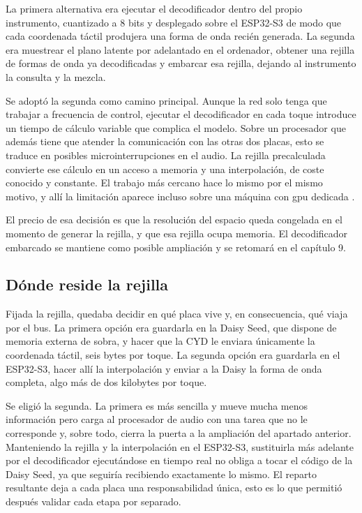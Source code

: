 La primera alternativa era ejecutar el decodificador dentro del propio
instrumento, cuantizado a 8 bits y desplegado sobre el ESP32-S3 de modo que
cada coordenada táctil produjera una forma de onda recién generada. La segunda
era muestrear el plano latente por adelantado en el ordenador, obtener una
rejilla de formas de onda ya decodificadas y embarcar esa rejilla, dejando al
instrumento la consulta y la mezcla.

Se adoptó la segunda como camino principal. Aunque la red solo tenga que
trabajar a frecuencia de control, ejecutar el decodificador en cada toque
introduce un tiempo de cálculo variable que complica el modelo. Sobre un procesador
que además tiene que atender la comunicación con las otras dos placas, esto se traduce 
en posibles microinterrupciones en el audio. La rejilla precalculada convierte ese cálculo
en un acceso a memoria y una interpolación, de coste conocido y constante. El trabajo más cercano
hace lo mismo por el mismo motivo, y allí la limitación aparece incluso sobre una máquina 
con \gls{gpu} dedicada \cite{Hantrakul2018}.

El precio de esa decisión es que la resolución del espacio queda congelada en el
momento de generar la rejilla, y que esa rejilla ocupa memoria. El decodificador
embarcado se mantiene como posible ampliación y se retomará en el capítulo 9.

\subsection{Dónde reside la rejilla}

Fijada la rejilla, quedaba decidir en qué placa vive y, en consecuencia, qué
viaja por el bus. La primera opción era guardarla en la Daisy Seed, que dispone de
memoria externa de sobra, y hacer que la CYD le enviara únicamente la
coordenada táctil, seis bytes por toque. La segunda opción era guardarla en el ESP32-S3,
hacer allí la interpolación y enviar a la Daisy la forma de onda completa, algo
más de dos kilobytes por toque.

Se eligió la segunda. La primera es más sencilla y mueve mucha menos
información pero carga al procesador de audio con una tarea que no le
corresponde y, sobre todo, cierra la puerta a la ampliación del apartado
anterior. Manteniendo la rejilla y la interpolación en el ESP32-S3, sustituirla
más adelante por el decodificador ejecutándose en tiempo real no obliga a tocar el
código de la Daisy Seed, ya que seguiría recibiendo exactamente lo mismo. El reparto
resultante deja a cada placa una responsabilidad única, esto es lo que permitió
después validar cada etapa por separado.

